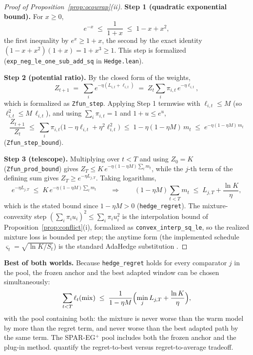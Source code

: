 \begin{proof}[Proof of Proposition~\ref{prop:ocowrap}(ii)]
\textbf{Step 1 (quadratic exponential bound).}
For $x \ge 0$,
\[
  e^{-x} \;\le\; \frac{1}{1+x} \;\le\; 1 - x + x^2,
\]
the first inequality by $e^x \ge 1 + x$, the second by the exact identity $(1 - x + x^2)(1 + x) = 1 + x^3 \ge 1$.
This step is formalized (\texttt{exp\_neg\_le\_one\_sub\_add\_sq} in \texttt{Hedge.lean}).

\textbf{Step 2 (potential ratio).}
By the closed form of the weights,
\[
  Z_{t+1}
  \;=\; \sum_i e^{-\eta(L_{i,t} + \ell_{i,t})}
  \;=\; Z_t \sum_i \pi_{i,t}\, e^{-\eta \ell_{i,t}} ,
\]
which is formalized as \texttt{Zfun\_step}.
Applying Step 1 termwise with $\ell_{i,t} \le M$ (so $\ell_{i,t}^2 \le M\,\ell_{i,t}$), and using $\sum_i \pi_{i,t} = 1$ and $1 + u \le e^u$,
\[
  \frac{Z_{t+1}}{Z_t}
  \;\le\; \sum_i \pi_{i,t}\bigl(1 - \eta \ell_{i,t} + \eta^2 \ell_{i,t}^2\bigr)
  \;\le\; 1 - \eta(1 - \eta M)\,m_t
  \;\le\; e^{-\eta(1 - \eta M)\,m_t}
\]
(\texttt{Zfun\_step\_bound}).

\textbf{Step 3 (telescope).}
Multiplying over $t < T$ and using $Z_0 = K$ (\texttt{Zfun\_prod\_bound}) gives
$Z_T \le K\, e^{-\eta(1 - \eta M)\sum_t m_t}$, while the $j$-th term of the defining sum gives $Z_T \ge e^{-\eta L_{j,T}}$.
Taking logarithms,
\[
  e^{-\eta L_{j,T}}
  \;\le\; K\, e^{-\eta(1 - \eta M)\sum_t m_t}
  \qquad\Longrightarrow\qquad
  (1 - \eta M)\sum_{t < T} m_t \;\le\; L_{j,T} + \frac{\ln K}{\eta},
\]
which is the stated bound since $1 - \eta M > 0$ (\texttt{hedge\_regret}).
The mixture-convexity step $(\sum_i \pi_i u_i)^2 \le \sum_i \pi_i u_i^2$ is the interpolation bound of Proposition~\ref{prop:conflict}(i), formalized as \texttt{convex\_interp\_sq\_le}, so the realized mixture loss is bounded per step; the anytime form (the implemented schedule $\varsigma_t = \sqrt{\ln K / S_t}$) is the standard AdaHedge substitution \citep{cesabianchi2006}.
\end{proof}

\medskip
\noindent\textbf{Best of both worlds.}
Because \texttt{hedge\_regret} holds for every comparator $j$ in the pool, the frozen anchor and the best adapted window can be chosen simultaneously:
\[
  \sum_{t<T} \ell_t(\mathrm{mix}) \;\le\; \frac{1}{1-\eta M}\Bigl(\min_j L_{j,T} + \frac{\ln K}{\eta}\Bigr),
\]
with the pool containing both: the mixture is never worse than the warm model by more than the regret term, and never worse than the best adapted path by the same term. The SPAR-EG$^+$ pool includes both the frozen anchor and the plug-in method.
\citet{evendar2008} quantify the regret-to-best versus regret-to-average tradeoff.

